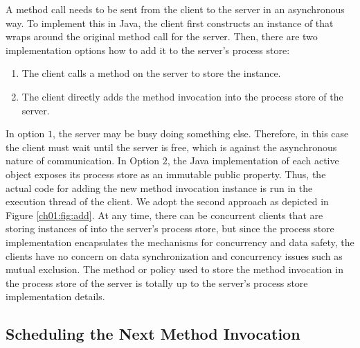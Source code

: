 A method call needs to be sent from the client to the server in an asynchronous way. 
To implement this in Java, the client first constructs an instance of
\MethodInvocation that wraps around the original method call for the server.
Then, 
%
there are two implementation options how to add it to the server's process store:
\begin{enumerate}
  \item The client calls a method on the server to store the instance.
  \item The client directly adds the method invocation into the process
store of the server. 
\end{enumerate}

In option $1$, the server may be busy doing something else. Therefore,
in this case the client must wait until the server is free,  which is
against the asynchronous nature of communication. In Option $2$, the
Java implementation of each active object exposes its process store as
an immutable public property. Thus, the actual code for adding the new
method invocation instance is run in the execution thread of the
client. 
We adopt the second approach as depicted in Figure \ref{ch01:fig:add}.
At any time, there can be concurrent clients that are
storing instances of  into the server's process store, but since
the process store implementation encapsulates the mechanisms for concurrency and
data safety, the clients have no concern on data synchronization and concurrency
issues such as mutual exclusion.
The method or policy used to store the method invocation in the process store of
the server is totally up to the server's process store implementation details.

\subsection{Scheduling the Next Method Invocation}

